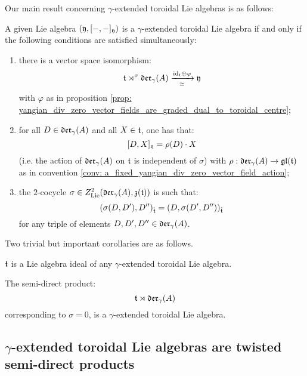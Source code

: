         Our main result concerning $\gamma$-extended toroidal Lie algebras is as follows:
        \begin{theorem} \label{theorem: yangian_extended_toroidal_lie_algebras_main_theorem}
            A given Lie algebra $(\mathfrak{y}, [-, -]_{\mathfrak{y}})$ is a $\gamma$-extended toroidal Lie algebra if and only if the following conditions are satisfied simultaneously:
            \begin{enumerate}
                \item there is a vector space isomorphism:
                    $$\mathfrak{t} \rtimes^{\sigma} \mathfrak{der}_{\gamma}(A) \xrightarrow[\simeq]{\mathrm{id}_{\mathfrak{t}} \oplus \varphi} \mathfrak{y}$$
                with $\varphi$ as in proposition \ref{prop: yangian_div_zero_vector_fields_are_graded_dual_to_toroidal_centre};
                \item for all $D \in \mathfrak{der}_{\gamma}(A)$ and all $X \in \mathfrak{t}$, one has that:
                    $$[D, X]_{\mathfrak{y}} = \rho(D) \cdot X$$
                (i.e. the action of $\mathfrak{der}_{\gamma}(A)$ on $\mathfrak{t}$ is independent of $\sigma$) with $\rho: \mathfrak{der}_{\gamma}(A) \to \mathfrak{gl}(\mathfrak{t})$ as in convention \ref{conv: a_fixed_yangian_div_zero_vector_field_action};

                \item the $2$-cocycle $\sigma \in Z^2_{\mathrm{Lie}}(\mathfrak{der}_{\gamma}(A), \mathfrak{z}(\mathfrak{t}))$ is such that:
                    $$(\sigma(D, D'), D'')_{\hat{\mathfrak{t}}} = (D, \sigma(D', D''))_{\hat{\mathfrak{t}}}$$
                for any triple of elements $D, D', D'' \in \mathfrak{der}_{\gamma}(A)$. 
            \end{enumerate}
        \end{theorem}
        Two trivial but important corollaries are as follows.
        \begin{corollary}
            $\mathfrak{t}$ is a Lie algebra ideal of any $\gamma$-extended toroidal Lie algebra.
        \end{corollary}
        \begin{corollary}
            The semi-direct product:
                $$\mathfrak{t} \rtimes \mathfrak{der}_{\gamma}(A)$$
            corresponding to $\sigma = 0$, is a $\gamma$-extended toroidal Lie algebra.
        \end{corollary}

    \subsection{\texorpdfstring{$\gamma$}{}-extended toroidal Lie algebras are twisted semi-direct products}

